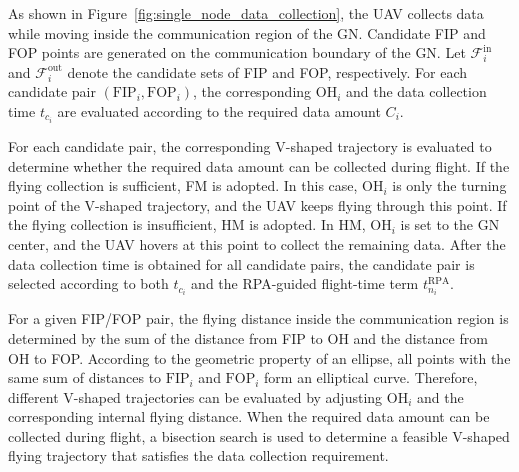 \documentclass[12pt]{ksthesis}
\begin{document}
\begin{thesis}
{    As shown in Figure~\ref{fig:single_node_data_collection}, the UAV collects data while moving inside the communication region of the GN. Candidate FIP and FOP points are generated on the communication boundary of the GN. Let \(\mathcal{F}_i^{\mathrm{in}}\) and \(\mathcal{F}_i^{\mathrm{out}}\) denote the candidate sets of FIP and FOP, respectively. For each candidate pair \((\mathrm{FIP}_i,\mathrm{FOP}_i)\), the corresponding \(\mathrm{OH}_i\) and the data collection time \(t_{c_i}\) are evaluated according to the required data amount \(C_i\).

    For each candidate pair, the corresponding V-shaped trajectory is evaluated to determine whether the required data amount can be collected during flight. If the flying collection is sufficient, FM is adopted. In this case, \(\mathrm{OH}_i\) is only the turning point of the V-shaped trajectory, and the UAV keeps flying through this point. If the flying collection is insufficient, HM is adopted. In HM, \(\mathrm{OH}_i\) is set to the GN center, and the UAV hovers at this point to collect the remaining data. After the data collection time is obtained for all candidate pairs, the candidate pair is selected according to both \(t_{c_i}\) and the RPA-guided flight-time term \(t_{n_i}^{\mathrm{RPA}}\).

    For a given FIP/FOP pair, the flying distance inside the communication region is determined by the sum of the distance from FIP to OH and the distance from OH to FOP. According to the geometric property of an ellipse, all points with the same sum of distances to \(\mathrm{FIP}_i\) and \(\mathrm{FOP}_i\) form an elliptical curve. Therefore, different V-shaped trajectories can be evaluated by adjusting \(\mathrm{OH}_i\) and the corresponding internal flying distance. When the required data amount can be collected during flight, a bisection search is used to determine a feasible V-shaped flying trajectory that satisfies the data collection requirement.
    
}
\end{thesis}
\end{document}
